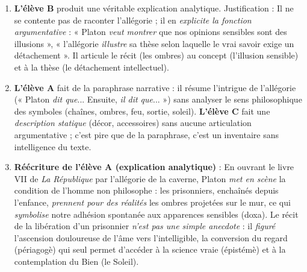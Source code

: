 \documentclass[11pt]{article}
\newcommand{\cle}[1]{{\popxbold\color{popdark}#1}}
\begin{document}
\begin{corrige}
\begin{enumerate}
\item \textbf{L'élève B} produit une véritable \cle{explication analytique}. Justification : Il ne se contente pas de raconter l'allégorie ; il en \emph{explicite la fonction argumentative} : « Platon \emph{veut montrer} que nos opinions sensibles sont des illusions », « l'allégorie \emph{illustre} sa thèse selon laquelle le vrai savoir exige un détachement ». Il articule le récit (les ombres) au concept (l'illusion sensible) et à la thèse (le détachement intellectuel).
\item \textbf{L'élève A} fait de la \cle{paraphrase narrative} : il résume l'intrigue de l'allégorie (« Platon \emph{dit que}... Ensuite, \emph{il dit que}... ») sans analyser le sens philosophique des symboles (chaînes, ombres, feu, sortie, soleil). \textbf{L'élève C} fait une \emph{description statique} (décor, accessoires) sans aucune articulation argumentative ; c'est pire que de la paraphrase, c'est un inventaire sans intelligence du texte.
\item \textbf{Réécriture de l'élève A (explication analytique)} :
\guillemotleft En ouvrant le livre VII de \emph{La République} par l'allégorie de la caverne, Platon \emph{met en scène} la condition de l'homme non philosophe : les prisonniers, enchaînés depuis l'enfance, \emph{prennent pour des réalités} les ombres projetées sur le mur, ce qui \emph{symbolise} notre adhésion spontanée aux apparences sensibles (doxa). Le récit de la libération d'un prisonnier \emph{n'est pas une simple anecdote} : il \emph{figuré} l'ascension douloureuse de l'âme vers l'intelligible, la conversion du regard (périagogè) qui seul permet d'accéder à la science vraie (épistémè) et à la contemplation du Bien (le Soleil). \guillemotright
\end{enumerate}
\end{corrige}
\end{document}

